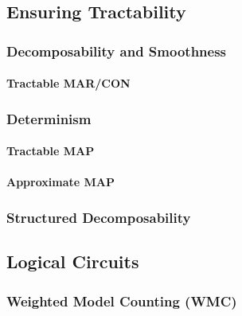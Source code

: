 		\subsection{Ensuring Tractability} %

			\subsubsection{Decomposability and Smoothness} %

				\paragraph{Tractable MAR/CON} %

			\subsubsection{Determinism} %

				\paragraph{Tractable MAP} %

				\paragraph{Approximate MAP} %

			\subsubsection{Structured Decomposability} %

		\subsection{Logical Circuits} %

			\subsubsection{Weighted Model Counting (WMC)} %

